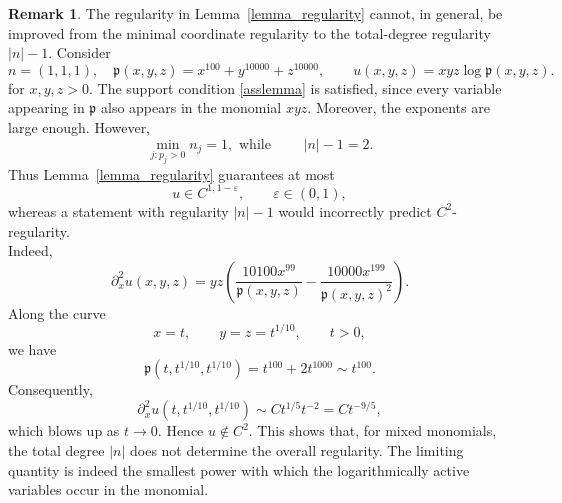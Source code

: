 \documentclass{amsart}
\theoremstyle{plain}
\theoremstyle{definition}
\newtheorem{remark}[theorem]{Remark}
\begin{document}
\begin{remark}
The regularity in Lemma~\ref{lemma_regularity} cannot, in general, be improved from the
minimal coordinate regularity to the total-degree regularity $|n|-1$. Consider
\begin{equation}
        n=(1,1,1),\quad \mathfrak p(x,y,z)
        =
        x^{100}+y^{10000}+z^{10000},
        \qquad
        u(x,y,z)
        =
        xyz\log\mathfrak p(x,y,z).
\end{equation}
for $x,y,z>0$. The support condition \eqref{asslemma} is satisfied, since every variable appearing in
$\mathfrak p$ also appears in the monomial $xyz$. Moreover, the exponents are
large enough. However,
\begin{equation}
        \min_{j:p_j>0} n_j=1, \text{ while }
        \qquad
        |n|-1=2.
\end{equation}
Thus Lemma~\ref{lemma_regularity} guarantees at most
\begin{equation}
        u\in C^{1,1-\varepsilon},
        \qquad
        \varepsilon\in(0,1),
\end{equation}
whereas a statement with regularity $|n|-1$ would incorrectly predict $C^2$-regularity.\\
Indeed,
\begin{equation}
        \partial_x^2 u(x,y,z)
        =
        yz\left(
        \frac{10100x^{99}}{\mathfrak p(x,y,z)}
        -
        \frac{10000x^{199}}{\mathfrak p(x,y,z)^2}
        \right).
\end{equation}
Along the curve
\begin{equation}
        x=t,
        \qquad
        y=z=t^{1/10},
        \qquad
        t>0,
\end{equation}
we have
\begin{equation}
        \mathfrak p(t,t^{1/10},t^{1/10})
        =
        t^{100}+2t^{1000}
        \sim
        t^{100}.
\end{equation}
Consequently,
\begin{equation}
        \partial_x^2 u(t,t^{1/10},t^{1/10})
        \sim
        C t^{1/5}t^{-2}
        =
        C t^{-9/5},
\end{equation}
which blows up as $t\to0$. Hence $u\notin C^2$. 
This shows that, for mixed monomials, the total degree $|n|$ does not determine the
overall regularity. The limiting quantity is indeed the smallest power with which the
logarithmically active variables occur in the monomial.
\end{remark}
\end{document}
